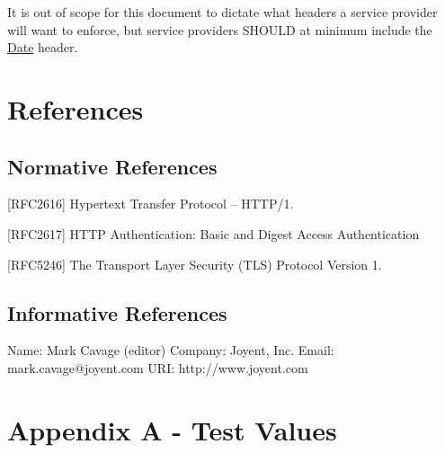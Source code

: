 It is out of scope for this document to dictate what headers a service provider will want to enforce, but service providers S\+H\+O\+U\+LD at minimum include the {\ttfamily \mbox{\hyperlink{classDate}{Date}}} header.

\section*{References}

\subsection*{Normative References}


\begin{DoxyItemize}
\item \mbox{[}R\+F\+C2616\mbox{]} Hypertext Transfer Protocol -- H\+T\+T\+P/1.
\item \mbox{[}R\+F\+C2617\mbox{]} H\+T\+TP Authentication\+: Basic and Digest Access Authentication
\item \mbox{[}R\+F\+C5246\mbox{]} The Transport Layer Security (T\+LS) Protocol Version 1.
\end{DoxyItemize}

\subsection*{Informative References}

\begin{DoxyVerb}Name: Mark Cavage (editor)
Company: Joyent, Inc.
Email: mark.cavage@joyent.com
URI: http://www.joyent.com
\end{DoxyVerb}


\section*{Appendix A -\/ Test Values}

